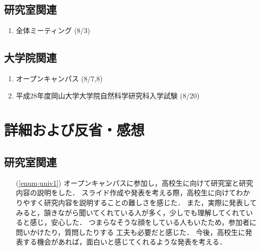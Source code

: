 \documentclass[fleqn, 14pt]{extarticle}
\begin{document}
    \subsection{研究室関連}
    \label{sec-2-2}
    \begin{enumerate}

        \item 全体ミーティング
            \hfill
            \label{enum-lab1}
            (8/3)

    \end{enumerate}

    \subsection{大学院関連}
    \label{sec2-3}
    \begin{enumerate}

        \item オープンキャンパス
            \hfill
            \label{enum-univ1}
            (8/7,8)

        \item 平成28年度岡山大学大学院自然科学研究科入学試験
            \hfill
            \label{enum-univ2}
            (8/20)
        
    \end{enumerate}

    \section{詳細および反省・感想}
    \label{sec-3}

    \setcounter{subsection}{1}
    \subsection{研究室関連}
    \label{sec-3-2}

    \begin{itemize}

        \item[(\ref{enum-univ1})]
            オープンキャンパスに参加し，高校生に向けて研究室と研究内容の説明をした．
            スライド作成や発表を考える際，高校生に向けてわかりやすく研究内容を説明することの難しさを感じた．
            また，実際に発表してみると，頷きながら聞いてくれている人が多く，少しでも理解してくれていると感じ，安心した．
            つまらなそうな顔をしている人もいたため，参加者に問いかけたり，質問したりする
            工夫も必要だと感じた．
            今後，高校生に発表する機会があれば，面白いと感じてくれるような発表を考える．

    \end{itemize}
\end{document}
